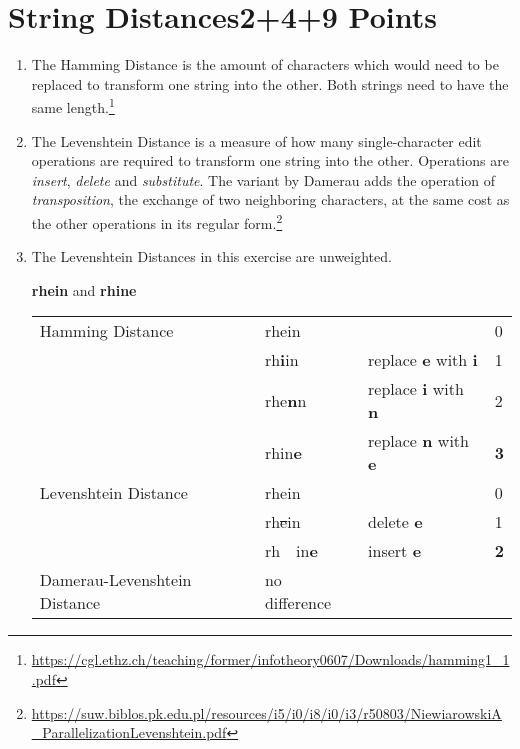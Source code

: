 \documentclass[10pt,a4paper]{article}
\begin{document}
\section{\hfill String Distances\hfill 2+4+9 Points}
\begin{enumerate}
    \item The Hamming Distance is the amount of characters which would need to be replaced to transform one string into the other. Both strings need to have the same length.\footnote{\url{https://cgl.ethz.ch/teaching/former/infotheory0607/Downloads/hamming1_1.pdf}}
    \item The Levenshtein Distance is a measure of how many single-character edit operations are required to transform one string into the other. Operations are \textit{insert}, \textit{delete} and \textit{substitute}. The variant by Damerau adds the operation of \textit{transposition}, the exchange of two neighboring characters, at the same cost as the other operations in its regular form.\footnote{\url{https://suw.biblos.pk.edu.pl/resources/i5/i0/i8/i0/i3/r50803/NiewiarowskiA_ParallelizationLevenshtein.pdf}}
    \item The Levenshtein Distances in this exercise are unweighted.
    
        \textbf{rhein} and \textbf{rhine}\\
        \begin{tabular}{llll}
             Hamming Distance               &rhein&&0\\
                                            &rh\textbf{i}in &replace \textbf{e} with \textbf{i} & 1\\
                                            &rhe\textbf{n}n &replace \textbf{i} with \textbf{n} & 2\\
                                            &rhin\textbf{e} &replace \textbf{n} with \textbf{e} & \textbf{3}\\
             Levenshtein Distance           &rhein&&0\\
                                            &rh\sout{e}in &delete \textbf{e} & 1\\
                                            &rh\ \ in\textbf{e} &insert \textbf{e} & \textbf{2}\\
             Damerau-Levenshtein Distance   &no difference\\
        \end{tabular}
    

\end{enumerate}
\end{document}

